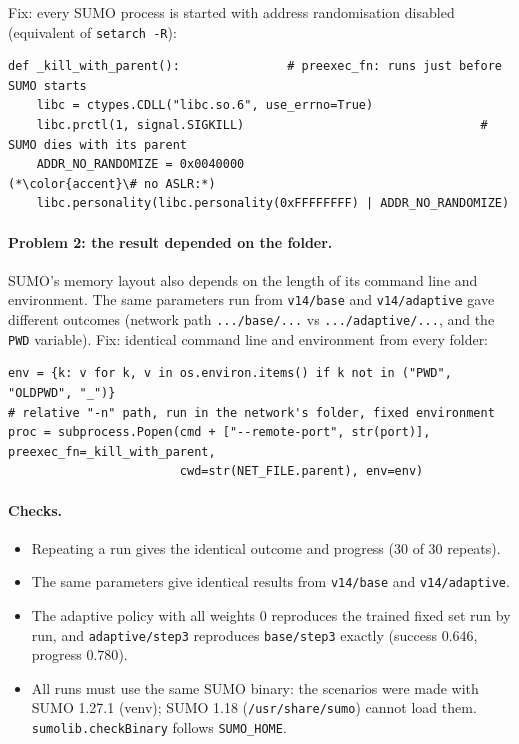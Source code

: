 \documentclass[11pt,a4paper]{article}
\begin{document}
Fix: every SUMO process is started with address randomisation disabled (equivalent of \texttt{setarch -R}):
\begin{lstlisting}
def _kill_with_parent():               # preexec_fn: runs just before SUMO starts
    libc = ctypes.CDLL("libc.so.6", use_errno=True)
    libc.prctl(1, signal.SIGKILL)                                 # SUMO dies with its parent
    ADDR_NO_RANDOMIZE = 0x0040000                                 (*\color{accent}\# no ASLR:*)
    libc.personality(libc.personality(0xFFFFFFFF) | ADDR_NO_RANDOMIZE)
\end{lstlisting}

\paragraph{Problem 2: the result depended on the folder.} SUMO's memory layout also depends on the length of
its command line and environment. The same parameters run from \texttt{v14/base} and \texttt{v14/adaptive} gave
different outcomes (network path \texttt{.../base/...} vs \texttt{.../adaptive/...}, and the \texttt{PWD} variable).
Fix: identical command line and environment from every folder:
\begin{lstlisting}
env = {k: v for k, v in os.environ.items() if k not in ("PWD", "OLDPWD", "_")}
# relative "-n" path, run in the network's folder, fixed environment
proc = subprocess.Popen(cmd + ["--remote-port", str(port)], preexec_fn=_kill_with_parent,
                        cwd=str(NET_FILE.parent), env=env)
\end{lstlisting}

\paragraph{Checks.}
\begin{itemize}
  \item Repeating a run gives the identical outcome and progress (30 of 30 repeats).
  \item The same parameters give identical results from \texttt{v14/base} and \texttt{v14/adaptive}.
  \item The adaptive policy with all weights $0$ reproduces the trained fixed set run by run, and
        \texttt{adaptive/step3} reproduces \texttt{base/step3} exactly (success $0.646$, progress $0.780$).
  \item All runs must use the same SUMO binary: the scenarios were made with SUMO 1.27.1 (venv); SUMO 1.18
        (\texttt{/usr/share/sumo}) cannot load them. \texttt{sumolib.checkBinary} follows \texttt{SUMO\_HOME}.
\end{itemize}
\end{document}
